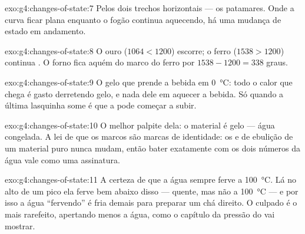 \begin{solution}{exo:g4:changes-of-state:7}
Pelos dois trechos horizontais --- os patamares. Onde a curva ficar
plana enquanto o fogão continua aquecendo, há uma mudança de estado
em andamento.
\end{solution}

\begin{solution}{exo:g4:changes-of-state:8}
O ouro ($1064 < 1200$) escorre; o ferro ($1538 > 1200$) continua
. O forno fica aquém do marco do ferro por
$1538 - 1200 = 338$ graus.
\end{solution}

\begin{solution}{exo:g4:changes-of-state:9}
O gelo que  prende a bebida em \qty{0}{\celsius}: todo o calor
que chega é gasto derretendo gelo, e nada dele em aquecer a bebida.
Só quando a última lasquinha some é que a  pode começar a
subir.
\end{solution}

\begin{solution}{exo:g4:changes-of-state:10}
O melhor palpite dela: o material é gelo --- água congelada. A lei de
que os marcos são marcas de identidade: os  e de
ebulição de um material puro nunca mudam, então bater exatamente com
os dois números da água vale como uma assinatura.
\end{solution}

\begin{solution}{exo:g4:changes-of-state:11}
A certeza de que a água sempre ferve a \qty{100}{\celsius}. Lá no
alto de um pico ela ferve bem abaixo disso --- quente, mas não a
\qty{100}{\celsius} --- e por isso a água ``fervendo'' é fria demais
para preparar um chá direito. O culpado é o  mais rarefeito,
apertando menos a água, como o capítulo da pressão do  vai
mostrar.
\end{solution}
